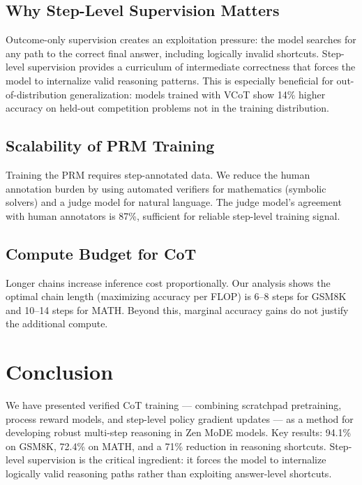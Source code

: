 \documentclass[11pt,a4paper]{article}
\begin{document}
\subsection{Why Step-Level Supervision Matters}

Outcome-only supervision creates an exploitation pressure: the model searches for any
path to the correct final answer, including logically invalid shortcuts. Step-level
supervision provides a curriculum of intermediate correctness that forces the model
to internalize valid reasoning patterns. This is especially beneficial for
out-of-distribution generalization: models trained with VCoT show 14\% higher accuracy
on held-out competition problems not in the training distribution.

\subsection{Scalability of PRM Training}

Training the PRM requires step-annotated data. We reduce the human annotation burden by
using automated verifiers for mathematics (symbolic solvers) and a judge model for
natural language. The judge model's agreement with human annotators is 87\%, sufficient
for reliable step-level training signal.

\subsection{Compute Budget for CoT}

Longer chains increase inference cost proportionally. Our analysis shows the optimal
chain length (maximizing accuracy per FLOP) is 6--8 steps for GSM8K and 10--14 steps
for MATH. Beyond this, marginal accuracy gains do not justify the additional compute.

\section{Conclusion}
\label{sec:conclusion}

We have presented verified CoT training — combining scratchpad pretraining, process
reward models, and step-level policy gradient updates — as a method for developing
robust multi-step reasoning in Zen MoDE models. Key results: 94.1\% on GSM8K,
72.4\% on MATH, and a 71\% reduction in reasoning shortcuts. Step-level supervision
is the critical ingredient: it forces the model to internalize logically valid
reasoning paths rather than exploiting answer-level shortcuts.
\end{document}
